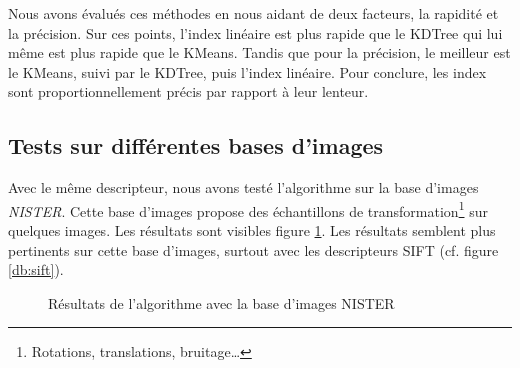 \documentclass{article}
\begin{document}
Nous avons évalués ces méthodes en nous aidant de deux facteurs, la rapidité et la précision.
Sur ces points, l'index linéaire est plus rapide que le KDTree qui lui même est plus rapide que le KMeans.
Tandis que pour la précision, le meilleur est le KMeans, suivi par le KDTree, puis l'index linéaire.
Pour conclure, les index sont proportionnellement précis par rapport à leur lenteur.



\subsection{Tests sur différentes bases d'images}

Avec le même descripteur, nous avons testé l'algorithme sur la base d'images {\em NISTER}. Cette base
d'images propose des échantillons de transformation\footnote{Rotations, translations, bruitage\ldots} sur quelques images.
Les résultats sont visibles figure \ref{db}. Les résultats semblent plus pertinents sur cette base d'images,
surtout avec les descripteurs SIFT (cf. figure \ref{db:sift}).

\begin{figure}[!ht]%
  \centering
  \hspace{0.01\textwidth}
  \caption{Résultats de l'algorithme avec la base d'images NISTER}
  \label{db}
\end{figure}
\end{document}
